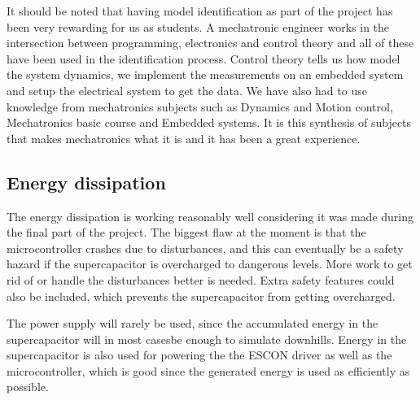 It should be noted that having model identification as part of the project has
been very rewarding for us as students. A mechatronic engineer works in the
intersection between programming, electronics and control theory and all of
these have been used in the identification process. Control theory tells us how
model the system dynamics, we implement the measurements on an embedded system
and setup the electrical system to get the data. We have also had to use
knowledge from mechatronics subjects such as Dynamics and Motion control,
Mechatronics basic course and Embedded systems. It is this synthesis of subjects
that makes mechatronics what it is and it has been a great experience. 

\subsection{Energy dissipation}
The energy dissipation is working reasonably well considering it was made during the final part of the project. The biggest flaw at the moment is that the microcontroller crashes due to disturbances, and this can eventually be a safety hazard if the supercapacitor is overcharged to dangerous levels. More work to get rid of or handle the disturbances better is needed. Extra safety features could also be included, which prevents the supercapacitor from getting overcharged. 

The power supply will rarely be used, since the accumulated energy in the  supercapacitor will in most casesbe enough to simulate downhills. Energy in the supercapacitor is also used for powering the the ESCON driver as well as the microcontroller, which is good since the generated energy is used as efficiently as possible. 
